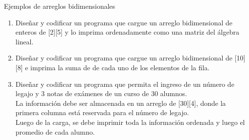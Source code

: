 \documentclass[xcolor=pdftex,table,11pt]{beamer}
\begin{document}
\begin{frame}{Ejemplos de arreglos bidimensionales}
 \begin{enumerate}
   
        \item Diseñar y codificar un programa que cargue un arreglo bidimensional de enteros de [2][5] y lo imprima ordenadamente como una matriz del álgebra lineal.
\href{https://github.com/danis963/informaticaI_IUA/blob/main/c/src/5-break_cont_1.c}{}

        \item Diseñar y codificar un programa que cargue un arreglo bidimensional de [10][8] e imprima la suma de de cada uno de los elementos de la fila.
\href{https://github.com/danis963/informaticaI_IUA/blob/main/c/src/5-break_cont_1.c}{}


        \item Diseñar y codificar un programa que permita el ingreso de un número de legajo y 3 notas de exámenes de un curso de 30 alumnos. \\
        La información debe ser almacenada en un arreglo de [30][4], donde la primera columna está reservada para el número de legajo.\\
        Luego de la carga, se debe imprimir toda la información ordenada y luego el promedio de cada alumno.
\href{https://github.com/danis963/informaticaI_IUA/blob/main/c/src/5-break_cont_1.c}{}

   \end{enumerate}
\end{frame}
\end{document}
